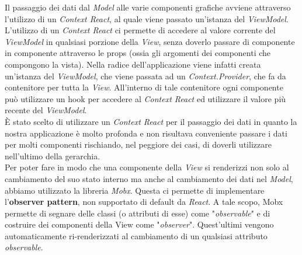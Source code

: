 Il passaggio dei dati dal \textit{Model} alle varie componenti grafiche avviene attraverso l'utilizzo di un \textit{Context React}, al quale viene passato un'istanza del \textit{ViewModel}. L'utilizzo di un \textit{Context React} ci permette di accedere al valore corrente del \textit{ViewModel} in qualsiasi porzione della \textit{View}, senza doverlo passare di componente in componente attraverso le props (ossia gli argomenti dei componenti che compongono la vista). Nella radice dell'applicazione viene infatti creata un'istanza del \textit{ViewModel}, che viene passata ad un \textit{Context.Provider}, che fa da contenitore per tutta la \textit{View}. All'interno di tale contenitore ogni componente può utilizzare un hook per accedere al \textit{Context React} ed utilizzare il valore più recente del \textit{ViewModel}.\\ È stato scelto di utilizzare un \textit{Context React} per il passaggio dei dati in quanto la nostra applicazione è molto profonda e non risultava conveniente passare i dati per molti componenti rischiando, nel peggiore dei casi, di doverli utilizzare nell'ultimo della gerarchia.\\
Per poter fare in modo che una componente della \textit{View} si renderizzi non solo al cambiamento del suo stato interno ma anche al cambiamento dei dati nel \textit{Model}, abbiamo utilizzato la libreria \textit{Mobx}. Questa ci permette di implementare l'\textbf{observer pattern}, non supportato di default da \textit{React}. A tale scopo, Mobx permette di segnare delle classi (o attributi di esse) come "\textit{observable}" e di costruire dei componenti della View come "\textit{observer}". Quest'ultimi vengono automaticamente ri-renderizzati al cambiamento di un qualsiasi attributo \textit{observable}.

\newpage

